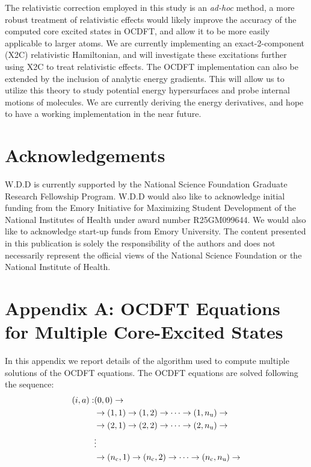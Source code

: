\documentclass[12pt]{article}
\begin{document}
The relativistic correction employed in this study is an \textit{ad-hoc} method, a more robust treatment of relativistic effects would likely improve the accuracy of the computed core excited states in OCDFT, and allow it to be more easily applicable to larger atoms. We are currently implementing an exact-2-component (X2C) relativistic Hamiltonian, and will investigate these excitations further using X2C to treat relativistic effects. The OCDFT implementation can also be extended by the inclusion of analytic energy gradients. This will allow us to utilize this theory to study potential energy hypersurfaces and probe internal motions of molecules. We are currently deriving the energy derivatives, and hope to have a working implementation in the near future. 

\section{Acknowledgements}
W.D.D is currently supported by the National Science Foundation Graduate Research Fellowship Program. W.D.D would also like to acknowledge initial funding from the Emory Initiative for Maximizing Student Development of the National Institutes of Health under award number R25GM099644. We would also like to acknowledge start-up funds from Emory University. The content presented in this publication is solely the responsibility of the authors and does not necessarily represent the official views of the National Science Foundation or the National Institute of Health.\\

%
%
\appendix
\renewcommand{\theequation}{A\arabic{equation}}
\section*{Appendix A: OCDFT Equations for Multiple Core-Excited States}
In this appendix we report details of the algorithm used to compute multiple solutions of the OCDFT equations.
The OCDFT equations are solved following the sequence:
\begin{equation}
\begin{split}
(i,a) : &(0,0) \rightarrow \\
        &\rightarrow (1,1) \rightarrow (1,2) \rightarrow \cdots \rightarrow (1,n_{\rm u})  \rightarrow\\
        &\rightarrow  (2,1) \rightarrow (2,2) \rightarrow \cdots \rightarrow (2,n_{\rm u})  \rightarrow\\
        & \vdots\\
        &\rightarrow  (n_{\rm c},1) \rightarrow (n_{\rm c},2) \rightarrow \cdots \rightarrow (n_{\rm c},n_{\rm u})  \rightarrow
\end{split}
\end{equation}
\end{document}
